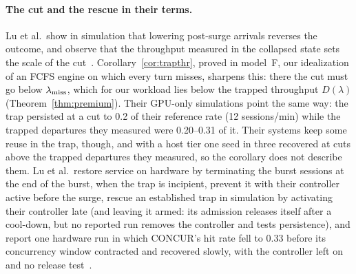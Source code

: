 \paragraph{The cut and the rescue in their terms.} Lu et al.\ show in
simulation that lowering post-surge arrivals reverses the outcome, and observe that the throughput measured in the collapsed state
sets the scale of the cut~\citep{lu2026cachetrap}. Corollary~\ref{cor:trapthr}, proved in model~F, our idealization of an FCFS engine on which
every turn misses, sharpens this: there the cut must go below $\lambda_{\mathrm{miss}}$, which for our workload lies below the trapped throughput $D(\lambda)$
(Theorem~\ref{thm:premium}). Their
GPU-only simulations point the same way: the trap persisted at a cut to 0.2 of their reference rate (12 sessions/min) while the
trapped departures they measured were 0.20--0.31 of it. Their
systems keep some reuse in the trap, though, and with a host tier one seed in three recovered at cuts above the trapped departures
they measured, so the corollary does not describe them.
Lu et
al.\ restore service on hardware by terminating the burst sessions at the end of the burst, when the trap is incipient, prevent it
with their controller active before the surge, rescue an established trap in simulation by activating their controller late (and
leaving it armed: its admission releases itself after a cool-down, but no reported run removes the controller and tests
persistence), and report one hardware run in which CONCUR's hit rate fell
to 0.33 before its concurrency window contracted and recovered slowly, with the controller left on and no release
test~\citep{lu2026cachetrap}.


